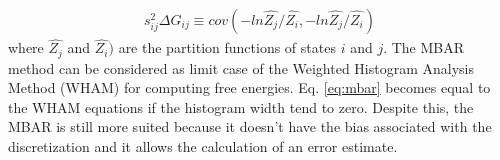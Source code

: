 \begin{equation}
\label{eq:varmbar}
\begin{aligned}
s_{ij}^{2} \Delta G_{ij} \equiv cov (-ln \hat{Z_{j}}/\hat{Z_{i}},-ln \hat{Z_{j}}/\hat{Z_{i}})
\end{aligned}
\end{equation}
where $\hat{Z_{j}}$ and $\hat{Z_{i}})$ are the partition functions of states $i$ and $j$. The MBAR method can be considered as limit case of the 
Weighted Histogram Analysis Method (WHAM) \cite{wham} for computing free energies. Eq. \eqref{eq:mbar} becomes equal to the WHAM equations if the histogram width tend to zero. Despite this, the MBAR is still more suited because it doesn't have the bias associated with the discretization  and it allows the calculation of an error estimate.





